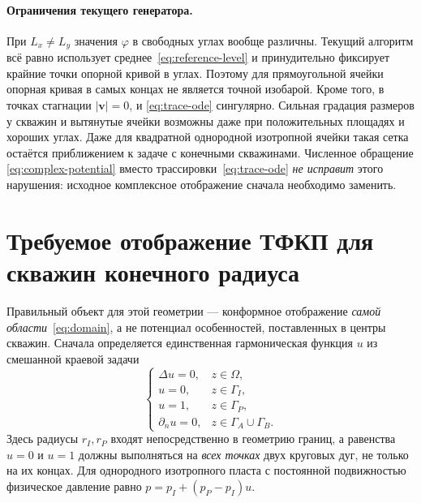 \documentclass[12pt,a4paper]{article}
\begin{document}
\paragraph{Ограничения текущего генератора.}
При $L_x\ne L_y$ значения $\varphi$ в свободных углах вообще различны.
Текущий алгоритм всё равно использует среднее~\eqref{eq:reference-level}
и принудительно фиксирует крайние точки опорной кривой в углах. Поэтому
для прямоугольной ячейки опорная кривая в самых концах не является точной
изобарой. Кроме того, в точках стагнации $|\mathbf v|=0$, и
\eqref{eq:trace-ode} сингулярно. Сильная градация размеров у скважин и
вытянутые ячейки возможны даже при положительных площадях и хороших углах.
Даже для квадратной однородной изотропной ячейки такая сетка остаётся
приближением к задаче с конечными скважинами. Численное обращение
\eqref{eq:complex-potential} вместо трассировки~\eqref{eq:trace-ode}
\emph{не исправит} этого нарушения: исходное комплексное отображение
сначала необходимо заменить.

\section{Требуемое отображение ТФКП для скважин конечного радиуса}

Правильный объект для этой геометрии --- конформное отображение
\emph{самой области}~\eqref{eq:domain}, а не потенциал особенностей,
поставленных в центры скважин. Сначала определяется единственная
гармоническая функция $u$ из смешанной краевой задачи
\begin{equation}
 \begin{cases}
  \Delta u=0,& z\in\Omega,\\
  u=0,&z\in\Gamma_I,\\
  u=1,&z\in\Gamma_P,\\
  \partial_nu=0,&z\in\Gamma_A\cup\Gamma_B.
 \end{cases}
 \label{eq:exact-map-bvp}
\end{equation}
Здесь радиусы $r_I,r_P$ входят непосредственно в геометрию границ, а
равенства $u=0$ и $u=1$ должны выполняться на \emph{всех точках} двух
круговых дуг, не только на их концах. Для однородного изотропного пласта
с постоянной подвижностью физическое давление равно
$p=p_I+(p_P-p_I)u$.
\end{document}
